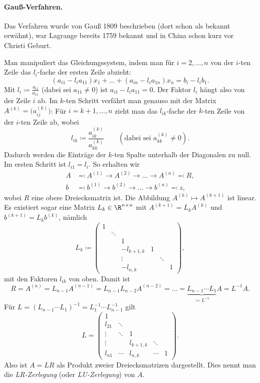 \documentclass[11pt]{article}
\begin{document}
\paragraph{Gauß-Verfahren.}
\begin{ergaenzung}
Das Verfahren wurde von Gauß 1809 beschrieben (dort schon als bekannt erwähnt), war Lagrange bereits 1759 bekannt und in China schon kurz vor Christi Geburt.
\end{ergaenzung}
Man manipuliert das Gleichungssystem, indem man für $i = 2, \dots, n$ von der $i$-ten Zeile das $l_i$-fache der ersten Zeile abzieht:
\[ (a_{i1} - l_i a_{11}) x_1 + \dots + (a_{in} - l_i a_{1n}) x_n = b_i - l_i b_1. \]
Mit $l_i \coloneqq \frac{a_{i1}}{a_{11}}$ (dabei sei $a_{11} \neq 0$) ist $a_{i1} - l_i a_{11} = 0$. Der Faktor $l_i$ hängt also von der Zeile $i$ ab.
Im $k$-ten Schritt verfährt man genauso mit der Matrix $A^{(k)} = \bigl(a^{(k)}_{ij}\bigr)$: Für $i = k+1, \dots, n$ zieht man das $l_{ik}$-fache der $k$-ten Zeile von der $i$-ten Zeile ab, wobei
\[ l_{ik} \coloneqq \frac{a^{(k)}_{ik}}{a^{(k)}_{kk}} \qquad (\text{dabei sei } a^{(k)}_{kk} \neq 0). \]
Dadurch werden die Einträge der $k$-ten Spalte unterhalb der Diagonalen zu null. Im ersten Schritt ist $l_{i1} = l_i$.
So erhalten wir
\begin{align*}
  A &\eqqcolon A^{(1)} \to A^{(2)} \to \dots \to A^{(n)} \eqqcolon R, \\
  b &\eqqcolon b^{(1)} \to b^{(2)} \to \dots \to b^{(n)} \eqqcolon z,
\end{align*}
wobei $R$ eine obere Dreiecksmatrix ist. Die Abbildung $A^{(k)} \mapsto A^{(k+1)}$ ist linear. Es existiert sogar eine Matrix $L_k \in \R^{n \times n}$ mit $A^{(k+1)} = L_k A^{(k)}$ und $b^{(k+1)} = L_k b^{(k)}$, nämlich
\[
  L_k \coloneqq \begin{pmatrix}
    1 & & & & & \\
    & \ddots & & & & \\
    & & 1 & & & \\
    & & -l_{k+1,k} & 1 & & \\
    & & \vdots & & \ddots & \\
    & & -l_{n,k} & & & 1
  \end{pmatrix},
\]
mit den Faktoren $l_{ik}$ von oben.
Damit ist
\[ R = A^{(n)} = L_{n-1} A^{(n-1)} = L_{n-1} L_{n-2} A^{(n-2)} = \dots = \underbrace{L_{n-1} \dotsm L_1}_{\eqqcolon L^{-1}} A = L^{-1} A. \]
Für $L = (L_{n-1} \dotsm L_1)^{-1} = L_1^{-1} \dotsm L_{n-1}^{-1}$ gilt
\[
  L = \begin{pmatrix}
    1 & & & & \\
    l_{21} & \ddots & & & \\
    \vdots & \ddots & 1 & & \\
    \vdots & & l_{k+1,k} & \ddots & \\
    l_{n1} & \cdots & l_{n,k} & \cdots & 1
  \end{pmatrix}.
\]
Also ist $A = LR$ als Produkt zweier Dreiecksmatrizen dargestellt. Dies nennt man die \emph{LR-Zerlegung} (oder \emph{LU-Zerlegung}) von $A$.
\end{document}
